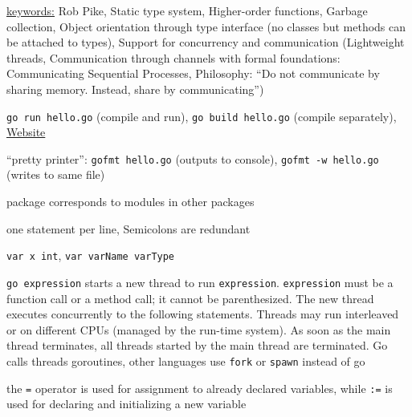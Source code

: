 \documentclass[landscape, a4paper]{article}
\begin{document}
\fontsize{3pt}{3pt}\selectfont

\begin{minipage}[t]{0.2\linewidth}
	  
	\begin{betterlist}
		\item \underline{keywords:} Rob Pike, Static type system, Higher-order functions, Garbage collection, Object orientation through type interface (no classes but methods can be attached to types), Support for concurrency and communication (Lightweight threads, Communication through channels with formal foundations: Communicating Sequential Processes, Philosophy: \enquote{Do not communicate by sharing memory. Instead, share by communicating})
	\end{betterlist}
	\begin{betterlist}
		\item \verb|go run hello.go| (compile and run), \verb|go build hello.go| (compile separately), \href{https://golang.org/}{Website}
		\item \alert{\enquote{pretty printer}:} \verb|gofmt hello.go| (outputs to console), \verb|gofmt -w hello.go| (writes to same file)
	\end{betterlist}
	\begin{betterlist}
		\item package corresponds to modules in other packages
		\item one statement per line, Semicolons are redundant
		\item \verb|var x int|, \verb|var varName varType|
		\item  \verb|go expression| starts a new thread to run \verb|expression|. \verb|expression| must be a function call or a method call; it cannot be parenthesized. The new thread executes concurrently to the following statements. Threads may run interleaved or on different CPUs (managed by the run-time system). As soon as the main thread terminates, all threads started by the main thread are terminated. Go calls threads \alert{goroutines}, other languages use \verb|fork| or \verb|spawn| instead of go
		\item the \verb|=| operator is used for assignment to already declared variables, while \verb|:=| is used for declaring and initializing a new variable
	\end{betterlist}
	 \href{https://wiki.haskell.org/Parallelism_vs._Concurrency}{} \href{https://go.dev/tour/concurrency/11}{}

\end{minipage}
\end{document}
